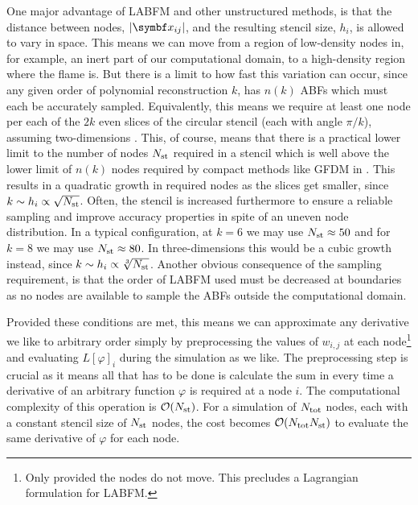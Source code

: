 One major advantage of LABFM and other unstructured methods, is that the distance between nodes, $\abs{\vb{x}_{ij}}$, and the resulting stencil size, $h_i$, is allowed to vary in space. This means we can move from a region of low-density nodes in, for example, an inert part of our computational domain, to a high-density region where the flame is. But there is a limit to how fast this variation can occur, since any given order of polynomial reconstruction $k$, has $n(k)$ ABFs which must each be accurately sampled. Equivalently, this means we require at least one node per each of the $2k$ even slices of the circular stencil (each with angle $\pi / k$), assuming two-dimensions \cite{king2020HighOrderDifference}. This, of course, means that there is a practical lower limit to the number of nodes $N_{\rm{st}}$ required in a stencil which is well above the lower limit of $n(k)$ nodes required by compact methods like GFDM in \cite{jensen1972FiniteDifferenceTechniques}. This results in a quadratic growth in required nodes as the slices get smaller, since $k \sim h_i \propto \sqrt{N_{\rm{st}}}$. Often, the stencil is increased furthermore to ensure a reliable sampling and improve accuracy properties in spite of an uneven node distribution. In a typical configuration, at $k = 6$ we may use $N_{\rm{st}} \approx 50$ and for $k = 8$ we may use $N_{\rm{st}} \approx 80$. In three-dimensions this would be a cubic growth instead, since $k \sim h_i \propto \sqrt[3]{N_{\rm{st}}}$. Another obvious consequence of the sampling requirement, is that the order of LABFM used must be decreased at boundaries as no nodes are available to sample the ABFs outside the computational domain.

Provided these conditions are met, this means we can approximate any derivative we like to arbitrary order simply by preprocessing the values of $w_{i, j}$ at each node\footnote{Only provided the nodes do not move. This precludes a Lagrangian formulation for LABFM.} and evaluating $L[φ]_i$ during the simulation as we like. The preprocessing step is crucial as it means all that has to be done is calculate the sum in  every time a derivative of an arbitrary function $φ$ is required at a node $i$. The computational complexity of this operation is $\cl{O}(N_{\rm{st}})$. For a simulation of $N_{\rm{tot}}$ nodes, each with a constant stencil size of $N_{\rm{st}}$ nodes, the cost becomes $\cl{O}(N_{\rm{tot}} N_{\rm{st}})$ to evaluate the same derivative of $φ$ for each node.




